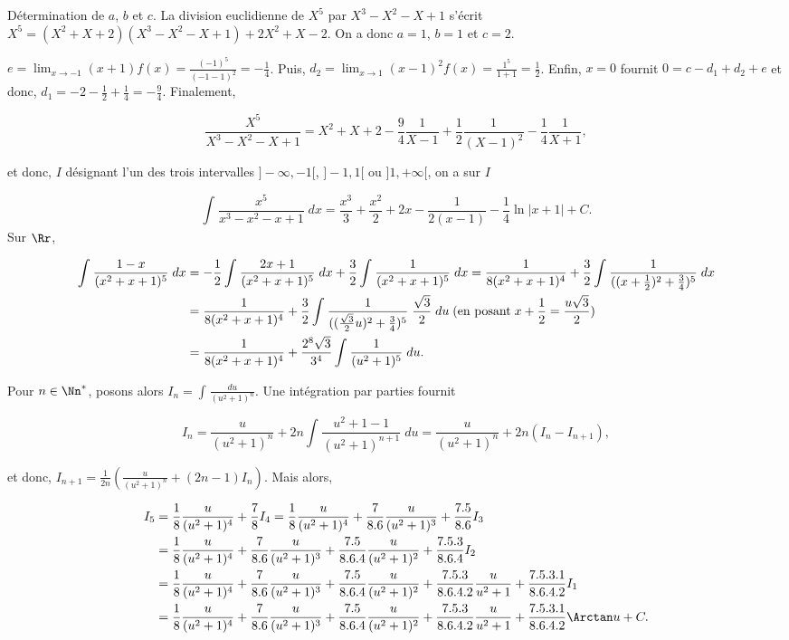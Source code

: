 {{Détermination de $a$, $b$ et $c$. La division euclidienne de $X^5$ par $X^3-X^2-X+1$ s'écrit $X^5=(X^2+X+2)(X^3-X^2-X+1)+2X^2+X-2$. On a donc $a=1$, $b=1$ et $c=2$.

$e=\lim_{x\rightarrow -1}(x+1)f(x)=\frac{(-1)^5}{(-1-1)^2}=-\frac{1}{4}$. Puis, $d_2=\lim_{x\rightarrow 1}(x-1)^2f(x)=\frac{1^5}{1+1}=\frac{1}{2}$. Enfin, $x=0$ fournit $0=c-d_1+d_2+e$ et donc, $d_1=-2-\frac{1}{2}+\frac{1}{4}=-\frac{9}{4}$. Finalement,

$$\frac{X^5}{X^3-X^2-X+1}=X^2+X+2-\frac{9}{4}\frac{1}{X-1}+\frac{1}{2}\frac{1}{(X-1)^2}-\frac{1}{4}\frac{1}{X+1},$$

et donc, $I$ désignant l'un des trois intervalles $]-\infty,-1[$, $]-1,1[$ ou $]1,+\infty[$, on a sur $I$

$$\int_{}^{}\frac{x^5}{x^3-x^2-x+1}\;dx=\frac{x^3}{3}+\frac{x^2}{2}+2x-\frac{1}{2(x-1)}-\frac{1}{4}\ln|x+1|+C.$$
Sur $\Rr$,

\begin{align*}\ensuremath
\int_{}^{}\frac{1-x}{(x^2+x+1)^5}\;dx&=-\frac{1}{2}\int_{}^{}\frac{2x+1}{(x^2+x+1)^5}\;dx+\frac{3}{2}\int_{}^{}\frac{1}{(x^2+x+1)^5}\;dx
=\frac{1}{8(x^2+x+1)^4}+\frac{3}{2}\int_{}^{}\frac{1}{((x+\frac{1}{2})^2+\frac{3}{4})^5}\;dx\\
 &=\frac{1}{8(x^2+x+1)^4}+\frac{3}{2}\int_{}^{}\frac{1}{((\frac{\sqrt{3}}{2}u)^2+\frac{3}{4})^5}\;\frac{\sqrt{3}}{2}\;du\;(\mbox{en posant}\;x+\frac{1}{2}=\frac{u\sqrt{3}}{2})\\
 &=\frac{1}{8(x^2+x+1)^4}+\frac{2^8\sqrt{3}}{3^4}\int_{}^{}\frac{1}{(u^2+1)^5}\;du.
\end{align*}

Pour $n\in\Nn^*$, posons alors $I_n=\int_{}^{}\frac{du}{(u^2+1)^n}$. Une intégration par parties fournit

$$I_n=\frac{u}{(u^2+1)^n}+2n\int_{}^{}\frac{u^2+1-1}{(u^2+1)^{n+1}}\;du=\frac{u}{(u^2+1)^n}+2n(I_n-I_{n+1}),$$

et donc, $I_{n+1}=\frac{1}{2n}\left(\frac{u}{(u^2+1)^n}+(2n-1)I_n\right)$. Mais alors,

\begin{align*}\ensuremath
I_5&=\frac{1}{8}\frac{u}{(u^2+1)^4}+\frac{7}{8}I_4=\frac{1}{8}\frac{u}{(u^2+1)^4}+\frac{7}{8.6}\frac{u}{(u^2+1)^3}+\frac{7.5}{8.6}I_3\\
 &=\frac{1}{8}\frac{u}{(u^2+1)^4}+\frac{7}{8.6}\frac{u}{(u^2+1)^3}+\frac{7.5}{8.6.4}\frac{u}{(u^2+1)^2}+\frac{7.5.3}{8.6.4}I_2\\
 &=\frac{1}{8}\frac{u}{(u^2+1)^4}+\frac{7}{8.6}\frac{u}{(u^2+1)^3}+\frac{7.5}{8.6.4}\frac{u}{(u^2+1)^2}+\frac{7.5.3}{8.6.4.2}\frac{u}{u^2+1}+\frac{7.5.3.1}{8.6.4.2}I_1\\
 &=\frac{1}{8}\frac{u}{(u^2+1)^4}+\frac{7}{8.6}\frac{u}{(u^2+1)^3}+\frac{7.5}{8.6.4}\frac{u}{(u^2+1)^2}+\frac{7.5.3}{8.6.4.2}\frac{u}{u^2+1}+\frac{7.5.3.1}{8.6.4.2}\Arctan u+C.
\end{align*}

}}
